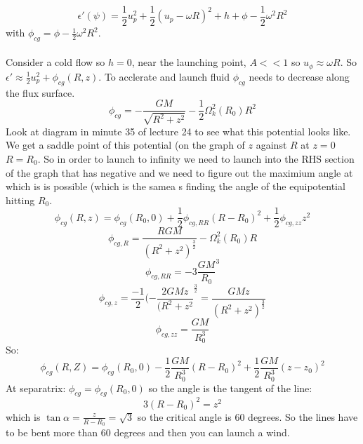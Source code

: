 \documentclass{article}
\begin{document}
$$
\epsilon'(\psi) = \frac{1}{2} u^2_p + \frac{1}{2}(u_p - \omega R)^2 + h + \phi - \frac{1}{2} \omega^2 R^2
$$
with $\phi_{cg} = \phi - \frac{1}{2} \omega^2 R^2$.\\\\
Consider a cold flow so $h = 0$, near the launching point, $A<<1$ so $u_{\phi} \approx \omega R$. So $\epsilon' \approx \frac{1}{2} u_p^2 + \phi_{cg}(R,z)$. To acclerate and launch fluid $\phi_{cg}$ needs to decrease along the flux surface.
$$
\phi_{cg} = - \frac{GM}{\sqrt{R^2 + z^2}} - \frac{1}{2} \Omega^2_k(R_0) R^2
$$
Look at diagram in minute 35 of lecture 24 to see what this potential looks like. We get a saddle point of this potential (on the graph of $z$ against $R$ at $z = 0$ $R=R_0$. So in order to launch to infinity we need to launch into the RHS section of the graph that has negative and we need to figure out the maximium angle at which is is possible (which is the samea s finding the angle of the equipotential hitting $R_0$.
$$
\phi_{cg}(R,z) = \phi_{cg}(R_0, 0) + \frac{1}{2} \phi_{cg, RR} (R-R_0)^2 + \frac{1}{2} \phi_{cg, zz} z^2
$$
$$
\phi_{cg,R} = \frac{R GM}{(R^2 + z^2)^{\frac{3}{2}}} - \Omega^2_k(R_0)R
$$
$$
\phi_{cg, RR} = - 3 \frac{GM}{R_0}^3
$$
$$
\phi_{cg, z} = \frac{-1}{2} ( - \frac{2GMz}{(R^2+ z^2}^{\frac{3}{2}} = \frac{GM z}{(R^2+z^2)^{\frac{3}{2}}}
$$
$$
\phi_{cg, zz} = \frac{GM}{R_0^3}
$$
So:
$$
\phi_{cg}(R,Z) = \phi_{cg}(R_0,0) - \frac{1}{2} \frac{GM}{R_0^3}(R-R_0)^2 + \frac{1}{2} \frac{GM}{R_0^3} (z-z_0)^2
$$
At separatrix: $\phi_{cg} = \phi_{cg}(R_0,0)$ so the angle is the tangent of the line:
$$
3(R-R_0)^2 = z^2 
$$
which is $\tan \alpha = \frac{z}{R-R_0} = \sqrt{3}$ so the critical angle is 60 degrees. So the lines have to be bent more than 60 degrees and then you can launch a wind.
\end{document}
